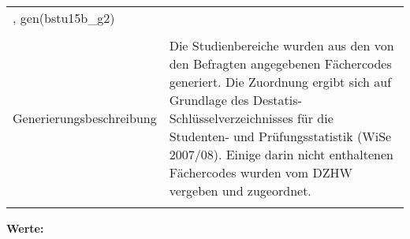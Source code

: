\begin{tabular}{lL{11.3cm}}
, gen(bstu15b\_g2) \\
				 \\
					Generierungsbeschreibung & Die Studienbereiche wurden aus den von den Befragten angegebenen Fächercodes generiert. Die Zuordnung ergibt sich auf Grundlage des Destatis-Schlüsselverzeichnisses für die Studenten- und Prüfungsstatistik (WiSe 2007/08). Einige darin nicht enthaltenen Fächercodes wurden vom DZHW vergeben und zugeordnet. 
				 \\	
			 \\
		\end{tabular}






			\vspace*{1 cm}
			\noindent\textbf{Werte:}\\
